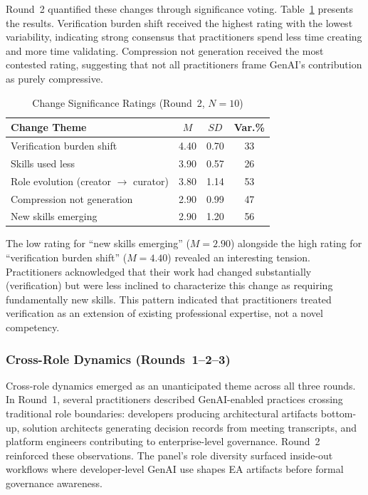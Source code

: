 Round~2 quantified these changes through significance voting.
Table~\ref{tab:change-significance} presents the results. Verification burden
shift received the highest rating with the lowest variability, indicating strong
consensus that practitioners spend less time creating and more time validating.
Compression not generation received the most contested rating, suggesting that
not all practitioners frame GenAI's contribution as purely compressive.

\begin{table}[!ht]
    \centering
    \caption{Change Significance Ratings (Round~2, $N = 10$)}\label{tab:change-significance}
    \begin{tabular}{|p{7cm}|c|c|c|}
        \hline
        \textbf{Change Theme} & \textbf{$M$} & \textbf{$SD$} & \textbf{Var.\%} \\
        \hline
        Verification burden shift & 4.40 & 0.70 & 33 \\
        \hline
        Skills used less & 3.90 & 0.57 & 26 \\
        \hline
        Role evolution (creator $\rightarrow$ curator) & 3.80 & 1.14 & 53 \\
        \hline
        Compression not generation & 2.90 & 0.99 & 47 \\
        \hline
        New skills emerging & 2.90 & 1.20 & 56 \\
        \hline
    \end{tabular}
\end{table}

The low rating for ``new skills emerging'' ($M = 2.90$) alongside the high
rating for ``verification burden shift'' ($M = 4.40$) revealed an interesting
tension. Practitioners acknowledged that their work had changed substantially
(verification) but were less inclined to characterize this change as requiring
fundamentally new skills. This pattern indicated that practitioners treated verification as an
extension of existing professional expertise, not a novel competency.

\subsubsection{Cross-Role Dynamics (Rounds~1--2--3)}\label{subsubsec:cross-role}

Cross-role dynamics emerged as an unanticipated theme across all three rounds.
In Round~1, several practitioners described GenAI-enabled practices crossing
traditional role boundaries: developers producing architectural artifacts
bottom-up, solution architects generating decision records from meeting
transcripts, and platform engineers contributing to enterprise-level governance.
Round~2 reinforced these observations. The panel's role diversity surfaced
inside-out workflows where developer-level GenAI use shapes EA artifacts before
formal governance awareness.

